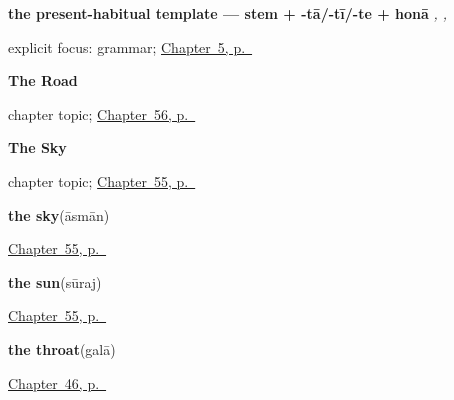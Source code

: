 \noindent\begin{minipage}[t]{\linewidth}
\raggedright
\textbf{the present-habitual template — stem + -tā/-tī/-te + honā}\enspace\emph{ ,  ,  }\par
\footnotesize explicit focus: grammar; \hyperref[ch:first-verbs]{Chapter~5, p.~\pageref*{ch:first-verbs}}
\end{minipage}\par\smallskip

\noindent\begin{minipage}[t]{\linewidth}
\raggedright
\textbf{The Road}\par
\footnotesize chapter topic; \hyperref[ch:hi-the-road]{Chapter~56, p.~\pageref*{ch:hi-the-road}}
\end{minipage}\par\smallskip

\noindent\begin{minipage}[t]{\linewidth}
\raggedright
\textbf{The Sky}\par
\footnotesize chapter topic; \hyperref[ch:hi-the-sky]{Chapter~55, p.~\pageref*{ch:hi-the-sky}}
\end{minipage}\par\smallskip

\noindent\begin{minipage}[t]{\linewidth}
\raggedright
\textbf{the sky}\enspace\emph{}\enspace(āsmān)\par
\footnotesize \hyperref[ch:hi-the-sky]{Chapter~55, p.~\pageref*{ch:hi-the-sky}}
\end{minipage}\par\smallskip

\noindent\begin{minipage}[t]{\linewidth}
\raggedright
\textbf{the sun}\enspace\emph{}\enspace(sūraj)\par
\footnotesize \hyperref[ch:hi-the-sky]{Chapter~55, p.~\pageref*{ch:hi-the-sky}}
\end{minipage}\par\smallskip

\noindent\begin{minipage}[t]{\linewidth}
\raggedright
\textbf{the throat}\enspace\emph{}\enspace(galā)\par
\footnotesize \hyperref[ch:hi-body-more]{Chapter~46, p.~\pageref*{ch:hi-body-more}}
\end{minipage}\par\smallskip

